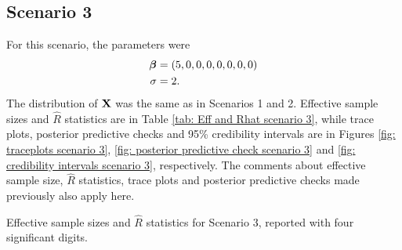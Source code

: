 \documentclass[a4paper, 10pt]{article}
\begin{document}
\subsection*{Scenario 3}
For this scenario, the parameters were
\begin{align*}
    \boldsymbol{\beta} &= (5, 0, 0, 0, 0, 0, 0, 0) \\
    \sigma &= 2
.\end{align*}
The distribution of $ \mathbf{X} $ was the same as in Scenarios 1 and 2.
Effective sample sizes and $ \hat{ R } $ statistics are in Table \ref{tab: Eff and Rhat scenario 3}, while trace plots, posterior predictive checks and 95\% credibility intervals are in Figures \ref{fig: traceplots scenario 3}, \ref{fig: posterior predictive check scenario 3} and \ref{fig: credibility intervals scenario 3}, respectively.
The comments about effective sample size, $ \hat{ R } $ statistics, trace plots and posterior predictive checks made previously also apply here.
\begin{table}[htb]
    \centering
    
    \quad
    
    \caption{Effective sample sizes and $ \hat{ R } $ statistics for Scenario 3, reported with four significant digits.}
    \label{tab: Eff and Rhat scenario 3}
\end{table}
\end{document}
